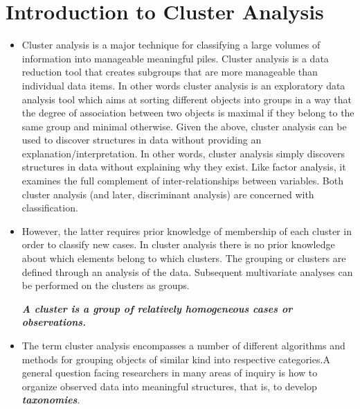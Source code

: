 \documentclass[a4paper,12pt]{article}
\begin{document}


\tableofcontents
\newpage

\section{Introduction to Cluster Analysis}


\begin{itemize}
\item Cluster analysis is a major technique for classifying a large volumes of information into
manageable meaningful piles. Cluster analysis is a data reduction tool that creates subgroups that are
more manageable than individual data items. In other words cluster analysis is an exploratory data analysis tool which aims at sorting different objects into groups in a way that the degree of association between two objects is maximal if they belong to the same group and minimal otherwise. Given the above, cluster analysis can be used to discover structures in data without providing an explanation/interpretation. In other words, cluster analysis simply discovers structures in data without explaining why they exist. Like factor analysis, it examines the full complement
of inter-relationships between variables. Both cluster analysis (and later, discriminant
analysis) are concerned with classification.

\item However, the latter requires prior knowledge of membership of each cluster in order to classify new cases. In cluster analysis
there is no prior knowledge about which elements belong to which clusters. The grouping
or clusters are defined through an analysis of the data. Subsequent multivariate analyses
can be performed on the clusters as groups.

\textbf{\textit{A cluster is a group of relatively homogeneous cases or observations.}}

\item 
The term cluster analysis encompasses a number of different algorithms and methods for grouping objects of similar kind into respective categories.A general question facing researchers in many areas of inquiry is how to organize observed data into meaningful structures, that is, to develop \textbf{\emph{taxonomies}}.
\end{itemize}
\end{document}
